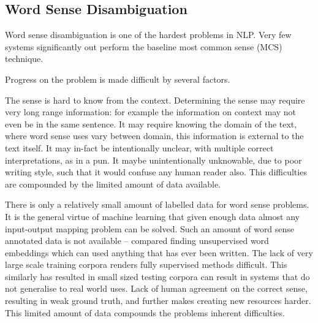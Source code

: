 \documentclass[12pt,parskip]{komatufte}
\begin{document}
\subsection{Word Sense Disambiguation}





Word sense disambiguation is one of the hardest problems in NLP.
Very few systems significantly out perform the baseline most common sense (MCS) technique.

Progress on the problem is made difficult by several factors.

The sense is hard to know from the context.
Determining the sense may require very long range information:
for example the information on context may not even be in the same sentence.
It may require knowing the domain of the text, where word sense uses vary between domain, this information is external to the text itself.
It may in-fact be intentionally unclear, with multiple correct interpretations, as in a pun.
It maybe unintentionally unknowable, due to poor writing style, such that it would confuse any human reader also.
This difficulties are compounded by the limited amount of data available.

There is only a relatively small amount of labelled data for word sense problems.
It is the general virtue of machine learning that given enough data almost any input-output mapping problem can be solved.
Such an amount of word sense annotated data is not available -- compared finding unsupervised word embeddings which can used anything that has ever been written.
The lack of very large scale training corpora renders fully supervised methods difficult.
This similarly has resulted in small sized testing corpora can result in systems that do not generalise to real world uses.
Lack of human agreement on the correct sense, resulting in weak ground truth, and further makes creating new resources harder.
This limited amount of data compounds the problems inherent difficulties.
\end{document}
